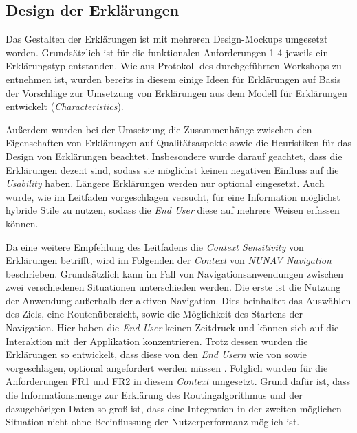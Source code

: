 \subsection{Design der Erklärungen}

Das Gestalten der Erklärungen ist mit mehreren Design-Mockups umgesetzt worden. Grundsätzlich ist für die funktionalen Anforderungen 1-4 jeweils ein Erklärungstyp entstanden. Wie aus Protokoll des durchgeführten Workshops zu entnehmen ist, wurden bereits in diesem einige Ideen für Erklärungen auf Basis der Vorschläge zur Umsetzung von Erklärungen aus dem Modell für Erklärungen entwickelt (\textit{Characteristics}).

Außerdem wurden bei der Umsetzung die Zusammenhänge zwischen den Eigenschaften von Erklärungen auf Qualitätsaspekte sowie die Heuristiken für das Design von Erklärungen beachtet. Insbesondere wurde darauf geachtet, dass die Erklärungen dezent sind, sodass sie möglichst keinen negativen Einfluss auf die \textit{Usability} haben. Längere Erklärungen werden nur optional eingesetzt. Auch wurde, wie im Leitfaden vorgeschlagen versucht, für eine Information möglichst hybride Stile zu nutzen, sodass die \textit{End User} diese auf mehrere Weisen erfassen können.

Da eine weitere Empfehlung des Leitfadens die \textit{Context Sensitivity} von Erklärungen betrifft, wird im Folgenden der \textit{Context} von \textit{NUNAV Navigation} beschrieben.
Grundsätzlich kann im Fall von Navigationsanwendungen zwischen zwei verschiedenen Situationen unterschieden werden. Die erste ist die Nutzung der Anwendung außerhalb der aktiven Navigation. Dies beinhaltet das Auswählen des Ziels, eine Routenübersicht, sowie die Möglichkeit des Startens der Navigation. Hier haben die \textit{End User} keinen Zeitdruck und können sich auf die Interaktion mit der Applikation konzentrieren. Trotz dessen wurden die Erklärungen so entwickelt, dass diese von den \textit{End Usern} wie von \citeauthor{chazette_end-users_nodate} sowie \citeauthor{wang_integration_2020} vorgeschlagen, optional angefordert werden müssen \cite{chazette_end-users_nodate,wang_integration_2020}. Folglich wurden für die Anforderungen FR1 und FR2 in diesem \textit{Context} umgesetzt. Grund dafür ist, dass die Informationsmenge zur Erklärung des Routingalgorithmus und der dazugehörigen Daten so groß ist, dass eine Integration in der zweiten möglichen Situation nicht ohne Beeinflussung der Nutzerperformanz möglich ist.

